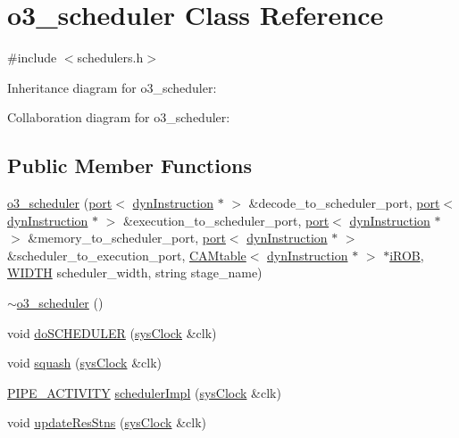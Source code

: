 \hypertarget{classo3__scheduler}{
\section{o3\_\-scheduler Class Reference}
\label{classo3__scheduler}
}


{\ttfamily \#include $<$schedulers.h$>$}



Inheritance diagram for o3\_\-scheduler:


Collaboration diagram for o3\_\-scheduler:
\subsection*{Public Member Functions}
\begin{DoxyCompactItemize}
\item 
\hyperlink{classo3__scheduler_a5aa72000043c2ff5cf065160560da9be}{o3\_\-scheduler} (\hyperlink{classport}{port}$<$ \hyperlink{classdynInstruction}{dynInstruction} $\ast$ $>$ \&decode\_\-to\_\-scheduler\_\-port, \hyperlink{classport}{port}$<$ \hyperlink{classdynInstruction}{dynInstruction} $\ast$ $>$ \&execution\_\-to\_\-scheduler\_\-port, \hyperlink{classport}{port}$<$ \hyperlink{classdynInstruction}{dynInstruction} $\ast$ $>$ \&memory\_\-to\_\-scheduler\_\-port, \hyperlink{classport}{port}$<$ \hyperlink{classdynInstruction}{dynInstruction} $\ast$ $>$ \&scheduler\_\-to\_\-execution\_\-port, \hyperlink{classCAMtable}{CAMtable}$<$ \hyperlink{classdynInstruction}{dynInstruction} $\ast$ $>$ $\ast$\hyperlink{backend_2parser_8cpp_ad73ae25f81e6e99482f3fbd5ba9664ce}{iROB}, \hyperlink{global_2global_8h_a6fa2e24b8a418fa215e183264cbea3aa}{WIDTH} scheduler\_\-width, string stage\_\-name)
\item 
\hyperlink{classo3__scheduler_ad9624ab36caacb50f844098a32b1fa94}{$\sim$o3\_\-scheduler} ()
\item 
void \hyperlink{classo3__scheduler_a336443d7d6e8f6b892c7c71b97099e40}{doSCHEDULER} (\hyperlink{classsysClock}{sysClock} \&clk)
\item 
void \hyperlink{classo3__scheduler_a53e17bdeda48c023a7f24e6871eeed4c}{squash} (\hyperlink{classsysClock}{sysClock} \&clk)
\item 
\hyperlink{unit_2stage_8h_ab00e4188e8b8974fecb1dfd12764cbb1}{PIPE\_\-ACTIVITY} \hyperlink{classo3__scheduler_ade8fe27e00ac0430122634af01c0639c}{schedulerImpl} (\hyperlink{classsysClock}{sysClock} \&clk)
\item 
void \hyperlink{classo3__scheduler_a3eaa3373cbbd123523a9cbf4d7326692}{updateResStns} (\hyperlink{classsysClock}{sysClock} \&clk)

\end{DoxyCompactItemize}

